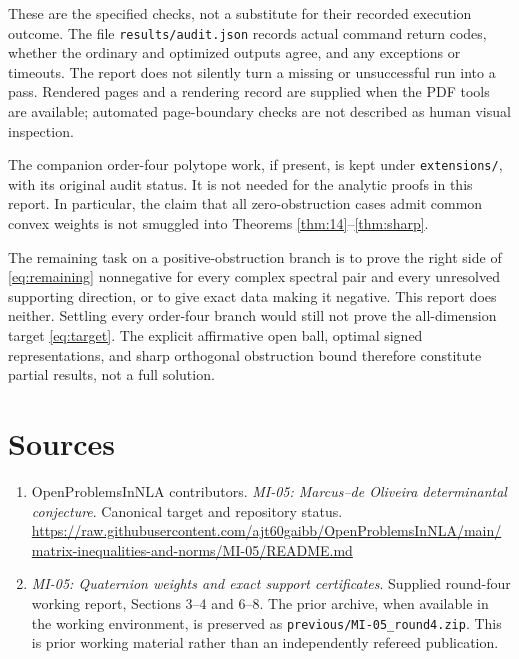 \documentclass[11pt,a4paper]{article}
\begin{document}
These are the specified checks, not a substitute for their recorded execution outcome. The file \texttt{results/audit.json} records actual command return codes, whether the ordinary and optimized outputs agree, and any exceptions or timeouts. The report does not silently turn a missing or unsuccessful run into a pass. Rendered pages and a rendering record are supplied when the PDF tools are available; automated page-boundary checks are not described as human visual inspection.

The companion order-four polytope work, if present, is kept under \texttt{extensions/}, with its original audit status. It is not needed for the analytic proofs in this report. In particular, the claim that all zero-obstruction cases admit common convex weights is not smuggled into Theorems \ref{thm:14}--\ref{thm:sharp}.

The remaining task on a positive-obstruction branch is to prove the right side of \eqref{eq:remaining} nonnegative for every complex spectral pair and every unresolved supporting direction, or to give exact data making it negative. This report does neither. Settling every order-four branch would still not prove the all-dimension target \eqref{eq:target}. The explicit affirmative open ball, optimal signed representations, and sharp orthogonal obstruction bound therefore constitute partial results, not a full solution.

\section*{Sources}
\begin{enumerate}
\item OpenProblemsInNLA contributors. \emph{MI-05: Marcus--de Oliveira determinantal conjecture}. Canonical target and repository status.\newline
\url{https://raw.githubusercontent.com/ajt60gaibb/OpenProblemsInNLA/main/matrix-inequalities-and-norms/MI-05/README.md}
\item \emph{MI-05: Quaternion weights and exact support certificates}. Supplied round-four working report, Sections 3--4 and 6--8. The prior archive, when available in the working environment, is preserved as \texttt{previous/MI-05\_round4.zip}. This is prior working material rather than an independently refereed publication.
\end{enumerate}
\end{document}

